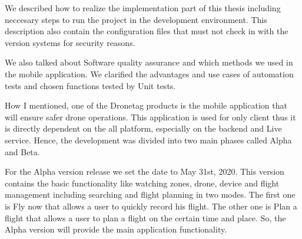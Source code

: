 We described how to realize the implementation part of this thesis including neccesary steps to run the project in the development environment.
This description also contain the configuration files that must not check in with the version systems for security reasons.

We also talked about Software quality assurance and which methods we used in the mobile application. %
We clarified the advantages and use cases of automation tests and chosen functions tested by Unit tests. %

How I mentioned, one of the Dronetag products is the mobile application that will ensure safer drone operations. %
This application is used for only client thus it is directly dependent on the all platform, especially on the backend and Live service. %
Hence, the development was divided into two main phases called Alpha and Beta. %

For the Alpha version release we set the date to May 31st, 2020. %
This version contains the basic functionality like watching zones, drone, device and flight management including searching and flight planning in two modes.
The first one is Fly now that allows a user to quickly record his flight. %
The other one is Plan a flight that allows a user to plan a flight on the certain time and place. %
So, the Alpha version will provide the main application functionality. %

